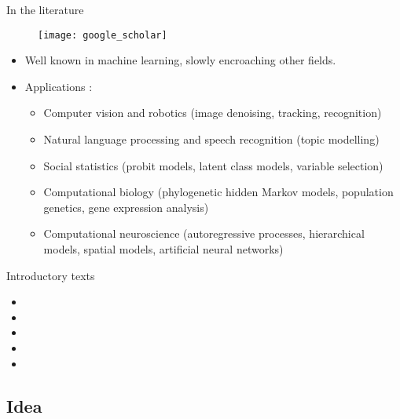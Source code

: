 \begin{frame}{In the literature}
  \vspace{-12pt}
  \begin{figure}[h]
    \texttt{[image: google\_scholar]}
  \end{figure}
  \vspace{-15pt}
  \begin{itemize}
    \item Well known in machine learning, slowly encroaching other fields.
    \pause
    \item Applications \citep{blei2017variational}:
    \begin{itemize}\footnotesize
      \item Computer vision and robotics {\color{gray!65}(image denoising, tracking, recognition)}   
      \item Natural language processing and speech recognition {\color{gray!65}(topic modelling)}
      \item Social statistics {\color{gray!65}(probit models, latent class models, variable selection)}   
      \item Computational biology {\color{gray!65}(phylogenetic hidden Markov models, population genetics, gene expression analysis)}
      \item Computational neuroscience {\color{gray!65}(autoregressive processes, hierarchical models, spatial models, artificial neural networks)}
    \end{itemize}
  \end{itemize}
\end{frame}

\begin{frame}{Introductory texts}
  \begin{itemize}
    \item {}
    \item {}
    \item {}
    \item {}
    \item {}
  \end{itemize}
\end{frame}

\subsection{Idea}

